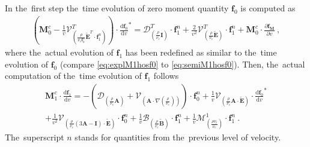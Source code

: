 \documentclass[review]{elsarticle}
\newcommand{\pdv}[2]{\frac{\partial{#1}}{\partial{#2}}}
\newcommand{\vect}[1]{\boldsymbol{#1}}
\newcommand{\matr}[1]{\mathbf{#1}}
\newcommand{\dI}{\text{d}}
\newcommand{\odv}[2]{\frac{\dI #1}{\dI #2}}
\newcommand{\ddv}[2]{\odv{#1}{#2}}
\newcommand{\nue}{\nu_{e}}
\newcommand{\nutot}{\nu_{t}}
\newcommand{\vmag}{v}
\newcommand{\tE}{\vect{\tilde{E}}}
\newcommand{\tB}{\vect{\tilde{B}}}
\newcommand{\fM}{f_M}
\newcommand{\vfzero}{\vect{f}_0}
\newcommand{\fone}{\vect{f}_1}
\newcommand{\MI}{\matr{I}}
\newcommand{\MA}{\matr{A}}
\newcommand{\IM}{\boldsymbol{\mathcal{M}}}
\newcommand{\ID}{\boldsymbol{\mathcal{D}}}
\newcommand{\IV}{\boldsymbol{\mathcal{V}}}
\newcommand{\IB}{\boldsymbol{\mathcal{B}}}
\begin{document}
In the~first step the~time evolution of zero moment quantity $\vfzero$ is 
computed as
\begin{multline}
  \left( \matr{M}^c_0 
  - \frac{1}{\vmag}
  \IV^T_{\left(\frac{\rho}{\nue\vfzero^n}\tE^T\cdot\fone^n\right)}
  \right) \cdot {\ddv{\vfzero}{\vmag}}^* 
  = 
  \ID^T_{\left(\frac{\rho}{\nue}\MI\right)} \cdot \fone^n 
  + \frac{2}{\vmag^2}\IV^T_{\left(\frac{\rho}{\nue}\tE\right)} \cdot \fone^n
  + \matr{M}^c_0 \cdot \pdv{\vect{\fM}}{\vmag}~,  
  \label{eq:explM1hosf0}
\end{multline}
where the~actual evolution of $\fone$ has been redefined as similar to 
the~time evolution of $\vfzero$ (compare \eqref{eq:explM1hosf0} to 
\eqref{eq:semiM1hosf0}). Then, the~actual computation of the~time evolution 
of $\fone$ follows
\begin{multline}
  \matr{M}^c_1 \cdot \ddv{\fone}{\vmag} 
  = 
  - \left(\ID_{\left(\frac{\rho}{\nue}\MA\right)}  
  + \IV_{\left( \MA \cdot \nabla\left(\frac{\rho}{\nue}\right) \right)} \right) 
  \cdot \vfzero^n  
  + \frac{1}{\vmag}\IV_{\left(\frac{\rho}{\nue}\MA \cdot \tE\right)} \cdot
  {\ddv{\vfzero}{\vmag}}^* \\
  + \frac{1}{\vmag^2}\IV_{\left(\frac{\rho}{\nue} 
  \left( 3\MA - \MI \right) \cdot \tE \right)} \cdot \vfzero^n
  + \frac{1}{\vmag}\IB_{\left( \frac{\rho}{\nue}\tB \right)} \cdot \fone^n
  + \frac{1}{\vmag}\IM^1_{\left( \frac{\rho \nutot}{\nue} \right)} 
  \cdot \fone^n~.
  \label{eq:explM1hosf1}
\end{multline}
The~superscript $n$ stands for quantities from the~previous level of velocity.
\end{document}
